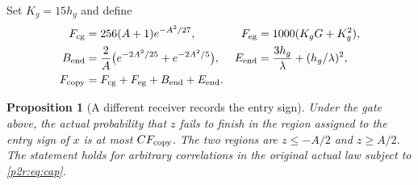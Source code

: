 \documentclass[11pt]{article}
\numberwithin{equation}{section}
\newtheorem{proposition}[theorem]{Proposition}
\theoremstyle{definition}
\theoremstyle{remark}
\begin{document}
Set $K_g=15h_g$ and define
\begin{align}
 F_{\rm cg}&=256(A+1)e^{-A^2/27},&
 F_{\rm eg}&=1000(K_gG+K_g^2),\label{p2r:eq:gatefees}\\
 B_{\rm end}&=\frac2A
          \big(e^{-2A^2/25}+e^{-2A^2/5}\big),&
 E_{\rm end}&=\frac{3h_g}{\lambda}
                       +(h_g/\lambda)^2,\label{p2r:eq:endfees}\\
 F_{\rm copy}&=F_{\rm cg}+F_{\rm eg}+B_{\rm end}+E_{\rm end}.
 \label{p2r:eq:copyfee}
\end{align}

\begin{proposition}[A different receiver records the entry sign]
\label{p2r:prop:copy}
Under the gate above, the actual probability that $z$ fails to
finish in the region assigned to the entry sign of $x$ is at most
$C F_{\rm copy}$. The two regions are
$z\leq-A/2$ and $z\geq A/2$. The statement holds for arbitrary
correlations in the original actual law subject to \eqref{p2r:eq:cap}.
\end{proposition}
\end{document}
